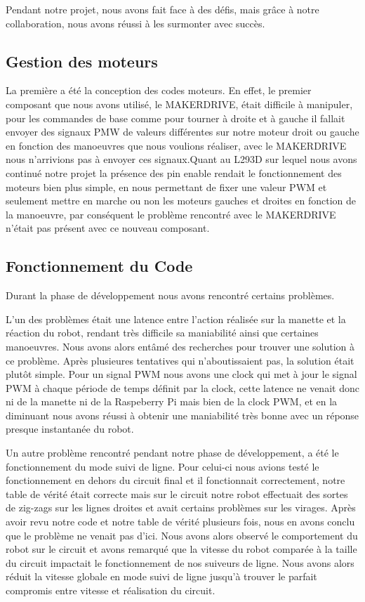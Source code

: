 Pendant notre projet, nous avons fait face à des défis, mais grâce à notre collaboration, nous avons réussi à les surmonter avec succès.

\subsection{Gestion des moteurs}
La première a été la conception des codes moteurs. En effet, le premier composant que nous avons utilisé, le MAKERDRIVE, était difficile à manipuler, pour les commandes de base comme pour tourner à droite et à gauche il fallait envoyer des signaux PMW de valeurs différentes sur notre moteur droit ou gauche en fonction des manoeuvres que nous voulions réaliser, avec le MAKERDRIVE nous n'arrivions pas à envoyer ces signaux.Quant au L293D sur lequel nous avons continué notre projet la présence des pin enable rendait le fonctionnement des moteurs bien plus simple, en nous permettant de fixer une valeur PWM et seulement mettre en marche ou non les moteurs gauches et droites en fonction de la manoeuvre, par conséquent le problème rencontré avec le MAKERDRIVE n'était pas présent avec ce nouveau composant.

\subsection{Fonctionnement du Code}
Durant la phase de développement nous avons rencontré certains problèmes.

L'un des problèmes était une latence entre l'action réalisée sur la manette et la réaction du robot, rendant très difficile sa maniabilité ainsi que certaines manoeuvres. Nous avons alors entâmé des recherches pour trouver une solution à ce problème. Après plusieures tentatives qui n'aboutissaient pas, la solution était plutôt simple. Pour un signal PWM nous avons une clock qui met à jour le signal PWM à chaque période de temps définit par la clock, cette latence ne venait donc ni de la manette ni de la Raspeberry Pi mais bien de la clock PWM, et en la diminuant nous avons réussi à obtenir une maniabilité très bonne avec un réponse presque instantanée du robot.

Un autre problème rencontré pendant notre phase de développement, a été le fonctionnement du mode suivi de ligne. Pour celui-ci nous avions testé le fonctionnement en dehors du circuit final et il fonctionnait correctement, notre table de vérité était correcte mais sur le circuit notre robot effectuait des sortes de zig-zags sur les lignes droites et avait certains problèmes sur les virages. Après avoir revu notre code et notre table de vérité plusieurs fois, nous en avons conclu que le problème ne venait pas d'ici. Nous avons alors observé le comportement du robot sur le circuit et avons remarqué que la vitesse du robot comparée à la taille du circuit impactait le fonctionnement de nos suiveurs de ligne. Nous avons alors réduit la vitesse globale en mode suivi de ligne jusqu'à trouver le parfait compromis entre vitesse et réalisation du circuit.


